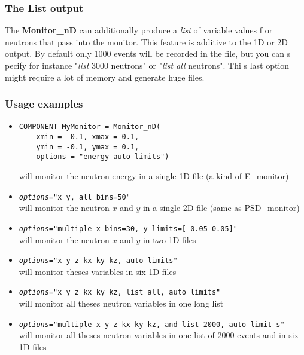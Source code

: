 \documentclass[12pt]{report}
\begin{document}
\subsubsection{The List output}

The {\bf Monitor\_nD} can additionally produce a {\it list} of variable values f
or neutrons that pass into the monitor. This feature is additive to the 1D or 2D
 output. By default only 1000 events will be recorded in the file, but you can s
pecify for instance "{\it list} 3000 neutrons" or "{\it list all} neutrons". Thi
s last option might require a lot of memory and generate huge files.

\subsubsection{Usage examples}

\begin{itemize}
\item{
\begin{verbatim}
COMPONENT MyMonitor = Monitor_nD( 
    xmin = -0.1, xmax = 0.1, 
    ymin = -0.1, ymax = 0.1, 
    options = "energy auto limits")
\end{verbatim}
will monitor the neutron energy in a single 1D file (a kind of E\_monitor)}
\item{\texttt{{\it options}="x y, all bins=50"} \\
will monitor the neutron $x$ and $y$ in a single 2D file (same as PSD\_monitor)}

\item{\texttt{{\it options}="multiple x bins=30, y limits=[-0.05 0.05]"} \\
will monitor the neutron $x$ and $y$ in two 1D files}
\item{\texttt{{\it options}="x y z kx ky kz,  auto limits"} \\
will monitor theses variables in six 1D files}
\item{\texttt{{\it options}="x y z kx ky kz, list all, auto limits"} \\
will monitor all theses neutron variables in one long list}
\item{\texttt{{\it options}="multiple x y z kx ky kz, and list 2000,  auto limit
s"} \\
will monitor all theses neutron variables in one list of 2000 events and in six 
1D files}
\end{itemize}


\end{document}
